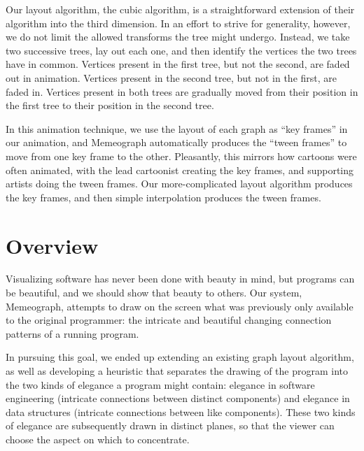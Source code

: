 \documentclass[11pt]{article}
\begin{document}
Our layout algorithm, the cubic algorithm, is a straightforward extension of
their algorithm into the third dimension.  In an effort to strive for
generality, however, we do not limit the allowed transforms the tree might
undergo.  Instead, we take two successive trees, lay out each one, and then
identify the vertices the two trees have in common.  Vertices present in the
first tree, but not the second, are faded out in animation.  Vertices present
in the second tree, but not in the first, are faded in.  Vertices present in
both trees are gradually moved from their position in the first tree to their
position in the second tree.

In this animation technique, we use the layout of each graph as ``key frames''
in our animation, and Memeograph automatically produces the ``tween frames''
to move from one key frame to the other.  Pleasantly, this mirrors how cartoons
were often animated, with the lead cartoonist creating the key frames, and
supporting artists doing the tween frames.  Our more-complicated layout
algorithm produces the key frames, and then simple interpolation produces the
tween frames.

\section{Overview}

Visualizing software has never been done with beauty in mind, but programs can
be beautiful, and we should show that beauty to others.  Our system, Memeograph\nocite{memeograph}, attempts to draw on the screen what was previously only available to the original programmer: the intricate and beautiful changing connection patterns of a running program.

In pursuing this goal, we ended up extending an existing graph layout algorithm, as well as developing a heuristic that separates the drawing of the program into the two kinds of elegance a program might contain: elegance in software engineering (intricate connections between distinct components) and elegance in data structures (intricate connections between like components).  These two kinds of elegance are subsequently drawn in distinct planes, so that the viewer can choose the aspect on which to concentrate.

\setlength{\baselineskip}{13pt} 

\end{document}
